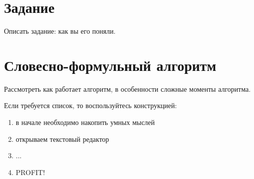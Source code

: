 








\section{Задание}
Описать задание: как вы его поняли.







\section{Словесно-формульный алгоритм}
Рассмотреть как работает алгоритм, в особенности сложные моменты
алгоритма.

Если требуется список, то воспользуйтесь конструкцией:
\begin{enumerate} %
\item в начале необходимо накопить умных мыслей
\item открываем текстовый редактор
\item ...
\item PROFIT!
\end{enumerate} %








